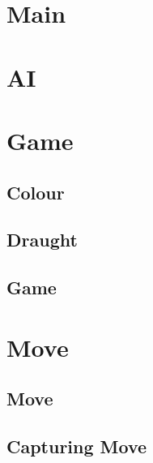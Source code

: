 \begin{appendices}
	\label{Appendix:start}
	\section{Main}
	{
		\label{appendix:Main}
		
	}
	\section{AI}
	{
		\label{appendix:AI}
		
	}
	\section{Game}
	{
		\subsection{Colour}
		{
			\label{appedix:Colour}
			
		}
		\subsection{Draught}
		{
			\label{appedix:Draught}
			
		}
		\subsection{Game}
		{
			\label{appedix:Game}
			
		}

	}
	\section{Move}
	{		\subsection{Move}
		{
			\label{appedix:Move}
			
		}
		\subsection{Capturing Move}
		{
			\label{appedix:CapturingMove}
			
		}
	}

\end{appendices}